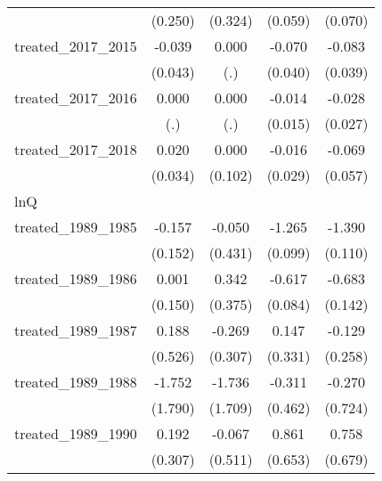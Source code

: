 {\begin{tabular}{l*{4}{c}}
            &     (0.250)         &     (0.324)         &     (0.059)         &     (0.070)         \\
[1em]
treated\_2017\_2015&      -0.039         &       0.000         &      -0.070         &      -0.083\sym{*}  \\
            &     (0.043)         &         (.)         &     (0.040)         &     (0.039)         \\
[1em]
treated\_2017\_2016&       0.000         &       0.000         &      -0.014         &      -0.028         \\
            &         (.)         &         (.)         &     (0.015)         &     (0.027)         \\
[1em]
treated\_2017\_2018&       0.020         &       0.000         &      -0.016         &      -0.069         \\
            &     (0.034)         &     (0.102)         &     (0.029)         &     (0.057)         \\
\hline
lnQ         &                     &                     &                     &                     \\
treated\_1989\_1985&      -0.157         &      -0.050         &      -1.265\sym{***}&      -1.390\sym{***}\\
            &     (0.152)         &     (0.431)         &     (0.099)         &     (0.110)         \\
[1em]
treated\_1989\_1986&       0.001         &       0.342         &      -0.617\sym{***}&      -0.683\sym{***}\\
            &     (0.150)         &     (0.375)         &     (0.084)         &     (0.142)         \\
[1em]
treated\_1989\_1987&       0.188         &      -0.269         &       0.147         &      -0.129         \\
            &     (0.526)         &     (0.307)         &     (0.331)         &     (0.258)         \\
[1em]
treated\_1989\_1988&      -1.752         &      -1.736         &      -0.311         &      -0.270         \\
            &     (1.790)         &     (1.709)         &     (0.462)         &     (0.724)         \\
[1em]
treated\_1989\_1990&       0.192         &      -0.067         &       0.861         &       0.758         \\
            &     (0.307)         &     (0.511)         &     (0.653)         &     (0.679)         \\

\end{tabular}}

